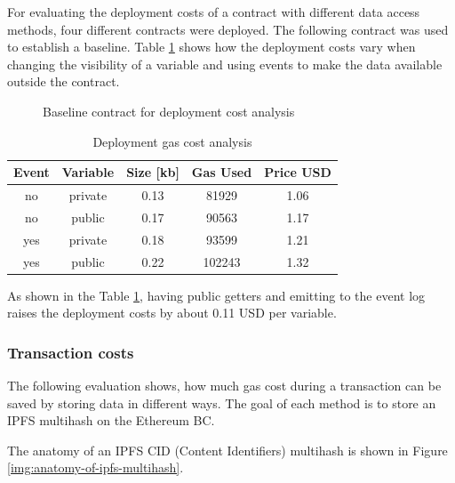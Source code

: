 For evaluating the deployment costs of a contract with different data access methods, four different contracts were deployed. The following contract was used to establish a baseline. Table \ref{tab:deployment-gas-cost-analysis} shows how the deployment costs vary when changing the visibility of a variable and using events to make the data available outside the contract.

\begin{figure}[H]
    
    \caption{Baseline contract for deployment cost analysis}
    \label{code:ipfs-storage}
\end{figure}

\begin{table}[ht]
\centering
\begin{tabular}{|c|c|c|c|c|}
\hline
\textbf{Event} & \textbf{Variable} & \textbf{Size {[}kb{]}} & \textbf{Gas Used} & \textbf{Price USD} \\ \hline
no             & private           & 0.13                   & 81929             & 1.06               \\ \hline
no             & public            & 0.17                   & 90563             & 1.17               \\ \hline
yes            & private           & 0.18                   & 93599             & 1.21               \\ \hline
yes            & public            & 0.22                   & 102243            & 1.32               \\ \hline
\end{tabular}
\caption{Deployment gas cost analysis}
\label{tab:deployment-gas-cost-analysis}
\end{table}

As shown in the Table \ref{tab:deployment-gas-cost-analysis}, having public getters and emitting to the event log raises the deployment costs by about 0.11 USD per variable. 


\subsubsection{Transaction costs}\label{sec:tx-costs-evaluation}
The following evaluation shows, how much gas cost during a transaction can be saved by storing data in different ways. The goal of each method is to store an IPFS multihash on the Ethereum BC.

The anatomy of an IPFS CID (Content Identifiers) multihash is shown in Figure \ref{img:anatomy-of-ipfs-multihash}. 

